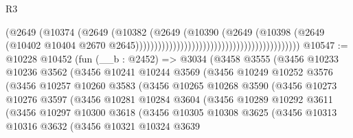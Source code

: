 \begin{lexlean}{R3}
\begin{coremodule}
                                                                        (@2649
                                                                          (@10374
                                                                            (@2649
                                                                              (@10382
                                                                                (@2649
                                                                                  (@10390
                                                                                    (@2649
                                                                                      (@10398
                                                                                        (@2649
                                                                                          (@10402
                                                                                            @10404
                                                                                            @2670
                                                                                            @2645))))))))))))))))))))))))))))))))))))))))))))
@10547 := @10228
    @10452
    (fun (__b : @2452) =>
    @3034
      (@3458
        @3555
        (@3456
          @10233
          @10236
          @3562
          (@3456
            @10241
            @10244
            @3569
            (@3456
              @10249
              @10252
              @3576
              (@3456
                @10257
                @10260
                @3583
                (@3456
                  @10265
                  @10268
                  @3590
                  (@3456
                    @10273
                    @10276
                    @3597
                    (@3456
                      @10281
                      @10284
                      @3604
                      (@3456
                        @10289
                        @10292
                        @3611
                        (@3456
                          @10297
                          @10300
                          @3618
                          (@3456
                            @10305
                            @10308
                            @3625
                            (@3456
                              @10313
                              @10316
                              @3632
                              (@3456
                                @10321
                                @10324
                                @3639

\end{coremodule}
\end{lexlean}
